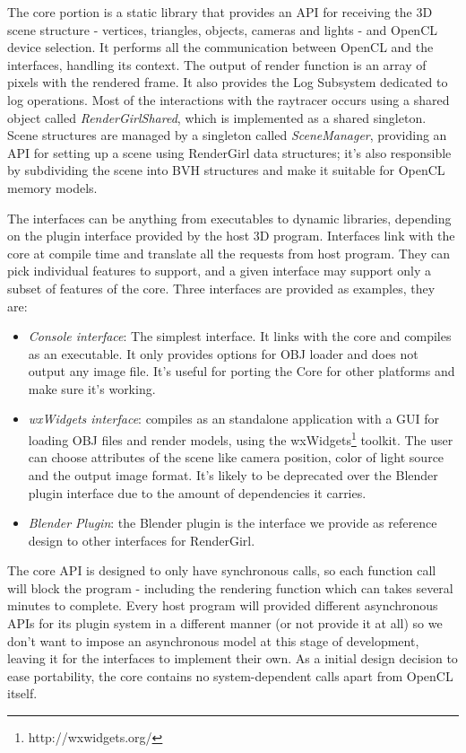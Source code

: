 \documentclass{vgtc}
\begin{document}
The core portion is a static library that provides an API for
receiving the 3D scene structure - vertices, triangles, objects,
cameras and lights - and OpenCL device selection. It performs all the
communication between OpenCL and the interfaces, handling its
context. The output of render function is an array of pixels with the
rendered frame. It also provides the Log Subsystem dedicated to log
operations. Most of the interactions with the raytracer occurs using a
shared object called \emph{RenderGirlShared}, which is implemented as
a shared singleton. Scene structures are managed by a singleton called
\emph{SceneManager}, providing an API for setting up a scene using
RenderGirl data structures; it's also responsible by subdividing the
scene into BVH structures and make it suitable for OpenCL memory
models.


The interfaces can be anything from executables to dynamic libraries,
depending on the plugin interface provided by the host 3D
program. Interfaces link with the core at compile time and translate
all the requests from host program. They can pick individual features
to support, and a given interface may support only a subset of
features of the core. Three interfaces are provided as examples, they
are:

\begin{itemize}
\item \emph{Console interface}: The simplest interface. It links with
  the core and compiles as an executable. It only provides options for
  OBJ loader and does not output any image file. It's useful for
  porting the Core for other platforms and make sure it's working.
\item \emph{wxWidgets interface}: compiles as an standalone
  application with a GUI for loading OBJ files and render models,
  using the wxWidgets\footnote{http://wxwidgets.org/} toolkit. The
  user can choose attributes of the scene like camera position, color
  of light source and the output image format. It's likely to be
  deprecated over the Blender plugin interface due to the amount of
  dependencies it carries.
\item \emph{Blender Plugin}: the Blender plugin is the interface we
  provide as reference design to other interfaces for RenderGirl.
\end{itemize}

The core API is designed to only have synchronous calls, so each
function call will block the program - including the rendering
function which can takes several minutes to complete. Every host
program will provided different asynchronous APIs for its plugin
system in a different manner (or not provide it at all) so we don't
want to impose an asynchronous model at this stage of development,
leaving it for the interfaces to implement their own. As a initial
design decision to ease portability, the core contains no
system-dependent calls apart from OpenCL itself.
\end{document}
